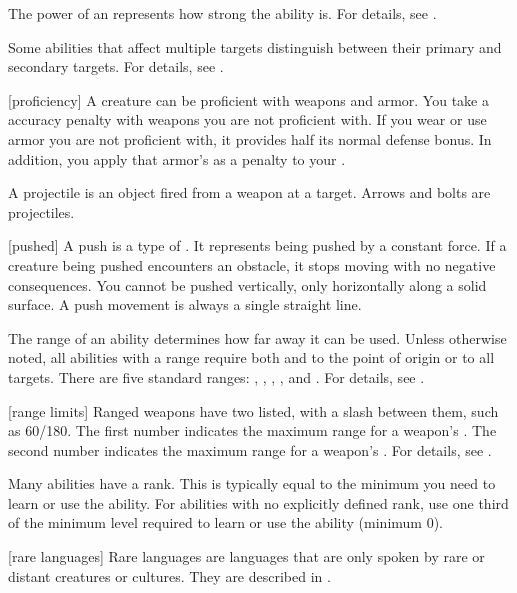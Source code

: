  The power of an  represents how strong the ability is.
For details, see .

 Some abilities that affect multiple targets distinguish between their primary and secondary targets.
For details, see .

[proficiency] A creature can be proficient with weapons and armor.
You take a  accuracy penalty with weapons you are not proficient with.
If you wear or use armor you are not proficient with, it provides half its normal defense bonus.
In addition, you apply that armor's  as a penalty to your .

 A projectile is an object fired from a weapon at a target.
Arrows and bolts are projectiles.

[pushed] A push is a type of .
It represents being pushed by a constant force.
If a creature being pushed encounters an obstacle, it stops moving with no negative consequences.
You cannot be pushed vertically, only horizontally along a solid surface.
A push movement is always a single straight line.

 The range of an ability determines how far away it can be used.
Unless otherwise noted, all abilities with a range require both  and  to the point of origin or to all targets.
There are five standard ranges: \shortrange, \medrange, \longrange, \distrange, and \extrange.
For details, see .

[range limits] Ranged weapons have two  listed, with a slash between them, such as 60/180.
The first number indicates the maximum range for a weapon's .
The second number indicates the maximum range for a weapon's .
For details, see .

 Many abilities have a rank.
This is typically equal to the minimum  you need to learn or use the ability.
For abilities with no explicitly defined rank, use one third of the minimum level required to learn or use the ability (minimum 0).

[rare languages] Rare languages are languages that are only spoken by rare or distant creatures or cultures.
They are described in .

